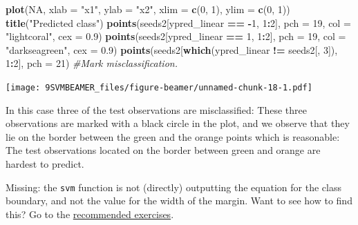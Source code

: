 \documentclass[ignorenonframetext,]{beamer}
\newenvironment{Shaded}{\begin{snugshade}}{\end{snugshade}}
\newcommand{\KeywordTok}[1]{\textcolor[rgb]{0.13,0.29,0.53}{\textbf{#1}}}
\newcommand{\DataTypeTok}[1]{\textcolor[rgb]{0.13,0.29,0.53}{#1}}
\newcommand{\DecValTok}[1]{\textcolor[rgb]{0.00,0.00,0.81}{#1}}
\newcommand{\FloatTok}[1]{\textcolor[rgb]{0.00,0.00,0.81}{#1}}
\newcommand{\StringTok}[1]{\textcolor[rgb]{0.31,0.60,0.02}{#1}}
\newcommand{\CommentTok}[1]{\textcolor[rgb]{0.56,0.35,0.01}{\textit{#1}}}
\newcommand{\OtherTok}[1]{\textcolor[rgb]{0.56,0.35,0.01}{#1}}
\newcommand{\OperatorTok}[1]{\textcolor[rgb]{0.81,0.36,0.00}{\textbf{#1}}}
\newcommand{\NormalTok}[1]{#1}
\begin{document}
\begin{frame}[fragile]
\begin{Shaded}
\begin{Highlighting}[]
\KeywordTok{plot}\NormalTok{(}\OtherTok{NA}\NormalTok{, }\DataTypeTok{xlab =} \StringTok{"x1"}\NormalTok{, }\DataTypeTok{ylab =} \StringTok{"x2"}\NormalTok{, }\DataTypeTok{xlim =} \KeywordTok{c}\NormalTok{(}\DecValTok{0}\NormalTok{, }\DecValTok{1}\NormalTok{), }\DataTypeTok{ylim =} \KeywordTok{c}\NormalTok{(}\DecValTok{0}\NormalTok{, }\DecValTok{1}\NormalTok{))}
\KeywordTok{title}\NormalTok{(}\StringTok{"Predicted class"}\NormalTok{)}
\KeywordTok{points}\NormalTok{(seeds2[ypred_linear }\OperatorTok{==}\StringTok{ }\OperatorTok{-}\DecValTok{1}\NormalTok{, }\DecValTok{1}\OperatorTok{:}\DecValTok{2}\NormalTok{], }\DataTypeTok{pch =} \DecValTok{19}\NormalTok{, }\DataTypeTok{col =} \StringTok{"lightcoral"}\NormalTok{, }
    \DataTypeTok{cex =} \FloatTok{0.9}\NormalTok{)}
\KeywordTok{points}\NormalTok{(seeds2[ypred_linear }\OperatorTok{==}\StringTok{ }\DecValTok{1}\NormalTok{, }\DecValTok{1}\OperatorTok{:}\DecValTok{2}\NormalTok{], }\DataTypeTok{pch =} \DecValTok{19}\NormalTok{, }\DataTypeTok{col =} \StringTok{"darkseagreen"}\NormalTok{, }
    \DataTypeTok{cex =} \FloatTok{0.9}\NormalTok{)}
\KeywordTok{points}\NormalTok{(seeds2[}\KeywordTok{which}\NormalTok{(ypred_linear }\OperatorTok{!=}\StringTok{ }\NormalTok{seeds2[, }\DecValTok{3}\NormalTok{]), }\DecValTok{1}\OperatorTok{:}\DecValTok{2}\NormalTok{], }\DataTypeTok{pch =} \DecValTok{21}\NormalTok{)  }\CommentTok{#Mark misclassification.}
\end{Highlighting}
\end{Shaded}

\texttt{[image: 9SVMBEAMER\_files/figure-beamer/unnamed-chunk-18-1.pdf]}

\normalsize

\end{frame}

\begin{frame}[fragile]

In this case three of the test observations are misclassified: These
three observations are marked with a black circle in the plot, and we
observe that they lie on the border between the green and the orange
points which is reasonable: The test observations located on the border
between green and orange are hardest to predict.

Missing: the \texttt{svm} function is not (directly) outputting the
equation for the class boundary, and not the value for the width of the
margin. Want to see how to find this? Go to the
\protect\hyperlink{recex}{recommended exercises}.

\end{frame}
\end{document}
